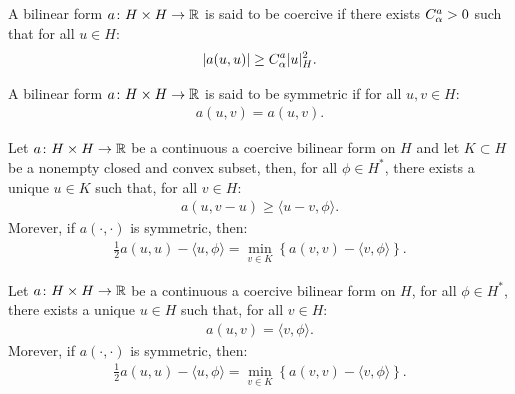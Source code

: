 \begin{definition}
    A bilinear form $a \colon H \times H \rightarrow \mathbb{R}$ is said to be coercive if there exists $C^{a}_{\alpha} > 0$ such that for all $u \in H$:
    \begin{gather}
        \lvert a(u, u) \rvert \geq C^{a}_{\alpha} \lvert u \rvert_H^2.
    \end{gather}
\end{definition}

\begin{definition}
    A bilinear form $a \colon H \times H \rightarrow \mathbb{R}$ is said to be symmetric if for all $u, v \in H$:
    \begin{gather}
        a(u, v) = a(u, v).
    \end{gather}
\end{definition}

\begin{theorem}[Stampacchia]
    Let $a \colon H \times H \rightarrow \mathbb{R}$ be a continuous a coercive bilinear form on $H$ and let $K \subset H$ be a nonempty closed and convex subset, then, for all $\phi \in H^*$, there exists a unique $u \in K$ such that, for all $v \in H$:
    \begin{gather}
        a(u, v - u) \geq \langle u - v, \phi \rangle.
    \end{gather}
    Morever, if $a(\cdot, \cdot)$ is symmetric, then:
    \begin{gather}
        \frac{1}{2} a(u, u) - \langle u, \phi \rangle = \min_{v \in K} \left\{ a(v, v) - \langle v, \phi \rangle \right\}.
    \end{gather}
\end{theorem}

\begin{corollary}
    Let $a \colon H \times H \rightarrow \mathbb{R}$ be a continuous a coercive bilinear form on $H$, for all $\phi \in H^*$, there exists a unique $u \in H$ such that, for all $v \in H$:
    \begin{gather}
        a(u, v) = \langle v, \phi \rangle.
    \end{gather}
    Morever, if $a(\cdot, \cdot)$ is symmetric, then:
    \begin{gather}
        \frac{1}{2} a(u, u) - \langle u, \phi \rangle = \min_{v \in K} \left\{ a(v, v) - \langle v, \phi \rangle \right\}.
    \end{gather}
\end{corollary}

